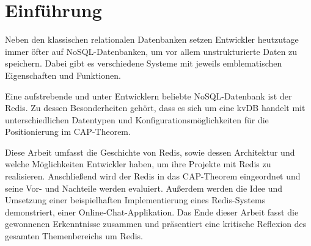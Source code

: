 
\chapter{Einführung}

Neben den klassischen relationalen Datenbanken setzen Entwickler heutzutage immer öfter auf \ac{NoSQL}-Datenbanken, um vor allem unstrukturierte Daten zu speichern. Dabei gibt es verschiedene Systeme mit jeweils emblematischen Eigenschaften und Funktionen. 

Eine aufstrebende und unter Entwicklern beliebte \ac{NoSQL}-Datenbank ist der \ac{Redis}. Zu dessen Besonderheiten gehört, dass es sich um eine \gls{kvDB} handelt mit unterschiedlichen Datentypen und Konfigurationsmöglichkeiten für die Positionierung im \acs{CAP}-Theorem.

Diese Arbeit umfasst die Geschichte von \ac{Redis}, sowie dessen Architektur und welche Möglichkeiten Entwickler haben, um ihre Projekte mit \ac{Redis} zu realisieren. Anschließend wird der \acl{Redis} in das \acs{CAP}-Theorem eingeordnet und seine Vor- und Nachteile werden evaluiert. Außerdem werden die Idee und Umsetzung einer beispielhaften Implementierung eines \ac{Redis}-Systems demonstriert, einer Online-Chat-Applikation. Das Ende dieser Arbeit fasst die gewonnenen Erkenntnisse zusammen und präsentiert eine kritische Reflexion des gesamten Themenbereichs um \ac{Redis}.